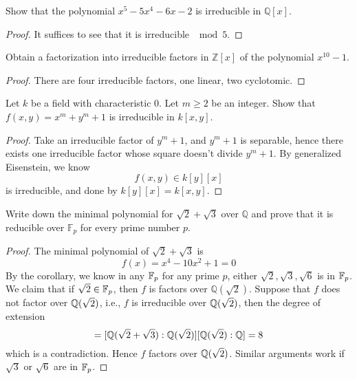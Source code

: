\begin{prob}[F2008-Q2]
    Show that the polynomial \(x^5 - 5x^4 - 6x - 2\) is irreducible in \(\mathbb{Q}[x]\).
\end{prob}
\begin{proof}
    It suffices to see that it is irreducible $\mod 5$.
\end{proof}

\begin{prob}[F2003-Q3]
    Obtain a factorization into irreducible factors in \(\mathbb{Z}[x]\) of the polynomial \(x^{10} - 1\).
\end{prob}
\begin{proof}
    There are four irreducible factors, one linear, two cyclotomic.
\end{proof}


\begin{prob}[S2004-Q3]
    Let \(k\) be a field with characteristic 0. Let \(m \geq 2\) be an integer. Show that \(f(x,y) = x^m + y^m + 1\) is irreducible in \(k[x,y]\).
\end{prob}
\begin{proof}
    Take an irreducible factor of $y^m+1$, and $y^m+1$ is separable, hence there exists one irreducible factor whose square doesn't divide $y^m+1$. By generalized Eisenstein, we know 
    \begin{equation*}
        f(x,y)\in k[y][x]
    \end{equation*}
    is irreducible, and done by $k[y][x]=k[x,y]$.
\end{proof}

\begin{prob}[S2017-Q2, S2007-Q3]
    Write down the minimal polynomial for \(\sqrt{2}+\sqrt{3}\) over \(\mathbb{Q}\) and prove that it is reducible over \(\mathbb{F}_{p}\) for every prime number \(p\).
\end{prob}
\begin{proof}
    The minimal polynomial of $\sqrt{2}+\sqrt{3}$ is 
    \begin{equation*}
        f(x)=x^4-10x^2+1=0
    \end{equation*}
    By the corollary, we know in any $\mathbb{F}_p$ for any prime $p$, either $\sqrt{2}, \sqrt{3}, \sqrt{6}$ is in $\mathbb{F}_p$. We claim that if $\sqrt{2}\in\mathbb{F}_p$, then $f$ is factors over $\mathbb{Q}(\sqrt{2})$. Suppose that $f$ does not factor over $\mathbb{Q}(\sqrt{2})$, i.e., $f$ is irreducible over $\mathbb{Q}(\sqrt{2})$, then the degree of extension 
    \begin{equation*}
        [\Q(\sqrt{2}+\sqrt{3}):\Q]=[\Q(\sqrt{2}+\sqrt{3}):\Q(\sqrt{2})][\Q(\sqrt{2}):\Q]=8
    \end{equation*}
    which is a contradiction. Hence $f$ factors over $\mathbb{Q}(\sqrt{2})$. Similar arguments work if $\sqrt{3}$ or $\sqrt{6}$ are in $\mathbb{F}_p$.
\end{proof}

